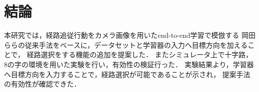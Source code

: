 \chapter{結論}

本研究では，経路追従行動をカメラ画像を用いたend-to-end学習で模倣する
岡田ら\cite{okada}らの従来手法をベースに，データセットと学習器の入力へ目標方向を加えることで，
経路選択をする機能の追加を提案した．
またシミュレータ上で十字路，8の字の環境を用いた実験を行い，有効性の検証行った．
実験結果より，学習器へ目標方向を入力することで，経路選択が可能であることが示され，
提案手法の有効性が確認できた．